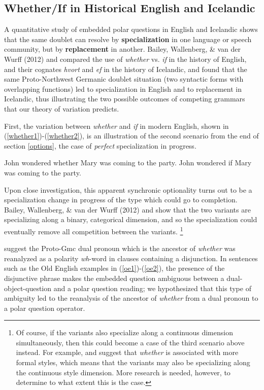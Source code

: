 \subsection{Whether/If in Historical English and Icelandic}

A quantitative study of embedded polar questions in English and Icelandic shows that the same doublet can resolve by \textbf{specialization} in one language or speech community, but by \textbf{replacement} in another. Bailey, Wallenberg, \& van der Wurff (2012) and  compared the use of \textsl{whether} vs. \textsl{if} in the history of English, and their cognates \textsl{hvort} and \textsl{ef} in the history of Icelandic, and found that the same Proto-Northwest Germanic doublet situation (two syntactic forms with overlapping functions) led to specialization in English and to replacement in Icelandic, thus illustrating the two possible outcomes of competing grammars that our theory of variation predicts.

First, the variation between \textsl{whether} and \textsl{if} in modern English, shown in (\ref{whether1})-(\ref{whether2}), is an illustration of the second scenario from the end of section \ref{options}, the case of \textsl{perfect} specialization in progress.

\begin{exe}
		\ex \label{whether1} John wondered whether Mary was coming to the party.
		\ex \label{whether2} John wondered if Mary was coming to the party.
	\end{exe}
	
\noindent Upon close investigation, this apparent synchronic optionality turns out to be a specialization change in progress of the type which could go to completion.
Bailey, Wallenberg, \& van der Wurff (2012) and  show that the two variants are specializing along a binary, categorical dimension, and so the specialization could eventually remove all competition between the variants.
\footnote{Of course, if the variants also specialize along a continuous dimension simultaneously, then this could become a case of the third scenario above instead.
For example, \citet[][690--3]{biberetal1999} and \citet[][973--5]{huddlestonpullum2002} suggest that \textsl{whether} is associated with more formal styles, which means that the variants may also be specializing along the continuous style dimension.
More research is needed, however, to determine to what extent this is the case.}

	
\citet{baileywallenbergwurff2012} suggest the Proto-Gmc dual pronoun which is the ancestor of \textsl{whether} was reanalyzed as a polarity \textsl{wh}-word in clauses containing a disjunction. In sentences such as the Old English examples in (\ref{oe1})-(\ref{oe2}), the presence of the disjunctive phrase makes the embedded question ambiguous between a dual-object-question and a polar question reading; we hypothesized that this type of ambiguity led to the reanalysis of the ancestor of \textsl{whether} from a dual pronoun to a polar question operator.

